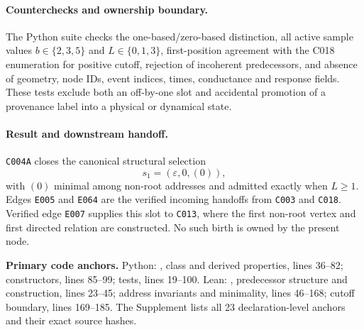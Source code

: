 \paragraph*{Counterchecks and ownership boundary.}
The Python suite checks the one-based/zero-based distinction, all active sample
values $b\in\{2,3,5\}$ and $L\in\{0,1,3\}$, first-position agreement with the
C018 enumeration for positive cutoff, rejection of incoherent predecessors,
and absence of geometry, node IDs, event indices, times, conductance and
response fields.  These tests exclude both an off-by-one slot and accidental
promotion of a provenance label into a physical or dynamical state.

\paragraph*{Result and downstream handoff.}
\texttt{C004A} closes the canonical structural selection
\begin{equation}
  s_1=(\varepsilon,0,(0)),
\end{equation}
with $(0)$ minimal among non-root addresses and admitted exactly when $L\ge1$.
Edges \texttt{E005} and \texttt{E064} are the verified incoming handoffs from
\texttt{C003} and \texttt{C018}.  Verified edge \texttt{E007} supplies this
slot to \texttt{C013}, where the first non-root vertex and first directed
relation are constructed.  No such birth is owned by the present node.

\noindent\textbf{Primary code anchors.}
Python:
,
class and derived properties, lines 36--82; constructors, lines 85--99; tests,
lines 19--100.  Lean:
,
predecessor structure and construction, lines 23--45; address invariants and
minimality, lines 46--168; cutoff boundary, lines 169--185.  The Supplement
lists all 23 declaration-level anchors and their exact source hashes.
